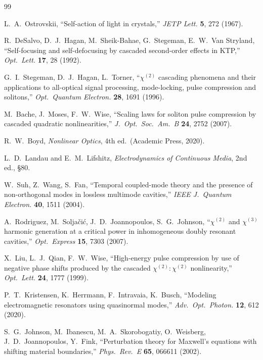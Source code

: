 \documentclass[11pt,a4paper]{article}
\begin{document}
\begin{thebibliography}{99}

L.~A.~Ostrovskii,
``Self-action of light in crystals,''
\emph{JETP Lett.} \textbf{5}, 272 (1967).

R.~DeSalvo, D.~J.~Hagan, M.~Sheik-Bahae, G.~Stegeman, E.~W.~Van Stryland,
``Self-focusing and self-defocusing by cascaded second-order effects in KTP,''
\emph{Opt.\ Lett.} \textbf{17}, 28 (1992).

G.~I.~Stegeman, D.~J.~Hagan, L.~Torner,
``$\chi^{(2)}$ cascading phenomena and their applications to all-optical signal processing, mode-locking, pulse compression and solitons,''
\emph{Opt.\ Quantum Electron.} \textbf{28}, 1691 (1996).

M.~Bache, J.~Moses, F.~W.~Wise,
``Scaling laws for soliton pulse compression by cascaded quadratic nonlinearities,''
\emph{J.~Opt.\ Soc.\ Am.\ B} \textbf{24}, 2752 (2007).

R.~W.~Boyd, \emph{Nonlinear Optics}, 4th ed.\ (Academic Press, 2020).

L.~D.~Landau and E.~M.~Lifshitz,
\emph{Electrodynamics of Continuous Media}, 2nd ed., \S 80.

W.~Suh, Z.~Wang, S.~Fan,
``Temporal coupled-mode theory and the presence of non-orthogonal modes in lossless multimode cavities,''
\emph{IEEE J.~Quantum Electron.} \textbf{40}, 1511 (2004).

A.~Rodriguez, M.~Solja\v{c}i\'c, J.~D.~Joannopoulos, S.~G.~Johnson,
``$\chi^{(2)}$ and $\chi^{(3)}$ harmonic generation at a critical power in inhomogeneous doubly resonant cavities,''
\emph{Opt.\ Express} \textbf{15}, 7303 (2007).

X.~Liu, L.~J.~Qian, F.~W.~Wise,
``High-energy pulse compression by use of negative phase shifts produced by the cascaded $\chi^{(2)}{:}\chi^{(2)}$ nonlinearity,''
\emph{Opt.\ Lett.} \textbf{24}, 1777 (1999).

P.~T.~Kristensen, K.~Herrmann, F.~Intravaia, K.~Busch,
``Modeling electromagnetic resonators using quasinormal modes,''
\emph{Adv.\ Opt.\ Photon.} \textbf{12}, 612 (2020).

S.~G.~Johnson, M.~Ibanescu, M.~A.~Skorobogatiy, O.~Weisberg, J.~D.~Joannopoulos, Y.~Fink,
``Perturbation theory for Maxwell's equations with shifting material boundaries,''
\emph{Phys.\ Rev.\ E} \textbf{65}, 066611 (2002).


\end{thebibliography}
\end{document}
